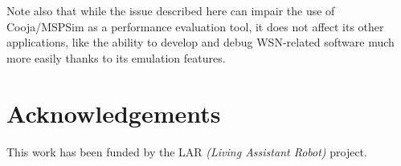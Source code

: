 \documentclass[10pt,emptycopyrightspace]{ewsn-proc}
\begin{document}
\medskip

Note also that while the issue described here can impair the use of
Cooja/MSPSim as a performance evaluation tool, it does not affect its other
applications, like the ability to develop and debug WSN-related software much
more easily thanks to its emulation features.

\medskip


\section{Acknowledgements}
\label{acks}

This work has been funded by the LAR \emph{(Living Assistant Robot)} project.

\medskip


\balance



\end{document}
